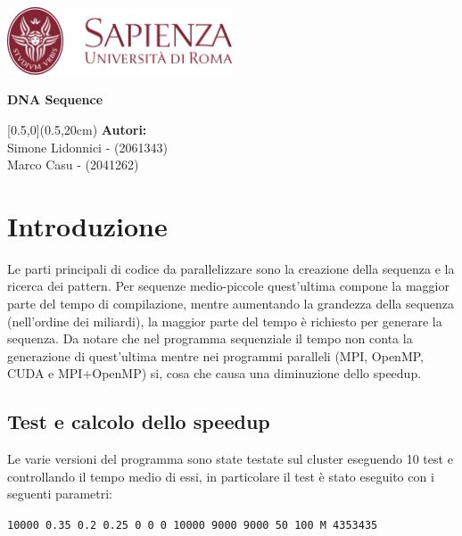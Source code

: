 \documentclass[12pt,openany]{report}
\date{\today}
\makeatletter
\def\tit{DNA Sequence}
\let\datename\@date
\def\authorname{Simone Lidonnici - (2061343)\\Marco Casu - (2041262)}
\makeatother
\begin{document}
\begin{titlepage}
    \begin{center}
        \includegraphics[width=0.5\textwidth]{images/Sapienza_logo.png}
    \end{center}
    \centering\Large \textbf{\color{Sapienza}{Facoltà di Ingegneria dell'Informazione, Informatica e Statistica\\Dipartimento di Informatica}}
    \vspace{4cm}
    \begin{tcolorbox}[enhanced, width=\textwidth, colframe=Sapienza, colback=white, halign=flush center, sharp corners=all, boxrule=1mm, bottom=5mm, top=5mm]
        \Huge\textbf{\tit}
    \end{tcolorbox}
    \begin{textblock*}{\textwidth}[0.5,0](0.5\pdfpagewidth,20cm)
        \centering\large\textbf{Autori:}\\\authorname
    \end{textblock*}
    \vfill
    \centering\large\datename
\end{titlepage}

\section{Introduzione}
Le parti principali di codice da parallelizzare sono la creazione della sequenza e la ricerca dei pattern. Per sequenze medio-piccole quest'ultima compone la maggior parte del tempo di compilazione, mentre aumentando la grandezza della sequenza (nell'ordine dei miliardi), la maggior parte del tempo è richiesto per generare la sequenza. Da notare che nel programma sequenziale il tempo non conta la generazione di quest'ultima mentre nei programmi paralleli (MPI, OpenMP, CUDA e MPI+OpenMP) si, cosa che causa una diminuzione dello speedup.
\subsection{Test e calcolo dello speedup}
Le varie versioni del programma sono state testate sul cluster eseguendo 10 test e controllando il tempo medio di essi, in particolare il test è stato eseguito con i seguenti parametri:
\begin{center}
    \texttt{10000 0.35 0.2 0.25 0 0 0 10000 9000 9000 50 100 M 4353435}
\end{center}
\end{document}
